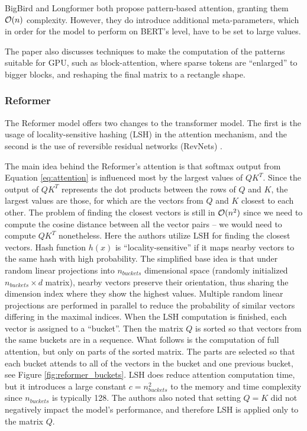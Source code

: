 BigBird and Longformer both propose pattern-based attention, granting them $\mathcal{O}(n)$ complexity.
However, they do introduce additional meta-parameters, which in order for the model to perform on BERT's level, have to be set to large values. 

The paper also discusses techniques to make the computation of the patterns suitable for GPU, such as block-attention, where sparse tokens are ``enlarged'' to bigger blocks, and reshaping the final matrix to a rectangle shape.

\subsubsection{Reformer}

The Reformer model \citep{reformer} offers two changes to the transformer model.
The first is the usage of locality-sensitive hashing (LSH) \citep{lsh} in the attention mechanism, and the second is the use of reversible residual networks (RevNets) \citep{revnets}.

The main idea behind the Reformer's attention is that softmax output from Equation \ref{eq:attention} is influenced most by the largest values of $QK^T$. 
Since the output of $QK^T$ represents the dot products between the rows of $Q$ and $K$, the largest values are those, for which are the vectors from $Q$ and $K$ closest to each other.
The problem of finding the closest vectors is still in $\mathcal{O}(n^2)$ since we need to compute the cosine distance between all the vector pairs -- we would need to compute $QK^T$ nonetheless. %
Here the authors utilize LSH for finding the closest vectors.
Hash function $h(x)$ is ``locality-sensitive'' if it maps nearby vectors to the same hash with high probability. 
The simplified base idea is that under random linear projections into $n_{buckets}$ dimensional space (randomly initialized $n_{buckets}\times d$ matrix), nearby vectors preserve their orientation, thus sharing the dimension index where they show the highest values.
Multiple random linear projections are performed in parallel to reduce the probability of similar vectors differing in the maximal indices.
When the LSH computation is finished, each vector is assigned to a ``bucket''.
Then the matrix $Q$ is sorted so that vectors from the same buckets are in a sequence.
What follows is the computation of full attention, but only on parts of the sorted matrix.
The parts are selected so that each bucket attends to all of the vectors in the bucket and one previous bucket, see Figure \ref{fig:reformer_buckets}.
LSH does reduce attention computation time, but it introduces a large constant $c=n_{buckets}^2$ to the memory and time complexity since $n_{buckets}$ is typically 128.
The authors also noted that setting $Q=K$ did not negatively impact the model's performance, and therefore LSH is applied only to the matrix $Q$.

